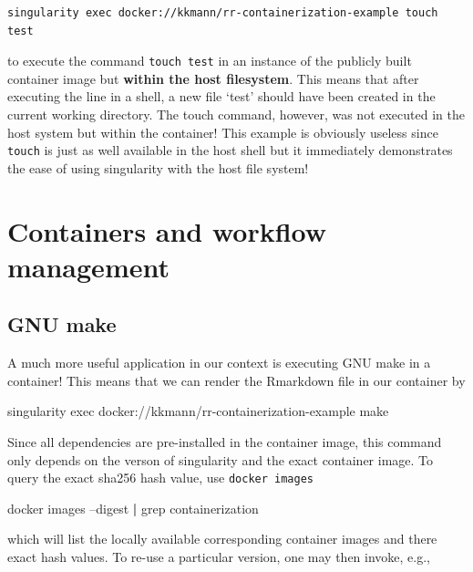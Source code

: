 \documentclass[]{book}
\newenvironment{Shaded}{\begin{snugshade}}{\end{snugshade}}
\newcommand{\KeywordTok}[1]{\textcolor[rgb]{0.13,0.29,0.53}{\textbf{#1}}}
\newcommand{\FunctionTok}[1]{\textcolor[rgb]{0.00,0.00,0.00}{#1}}
\newcommand{\ExtensionTok}[1]{#1}
\newcommand{\NormalTok}[1]{#1}
\begin{document}
\begin{verbatim}
singularity exec docker://kkmann/rr-containerization-example touch test
\end{verbatim}

to execute the command \texttt{touch\ test} in an instance of the
publicly built container image but \textbf{within the host filesystem}.
This means that after executing the line in a shell, a new file `test'
should have been created in the current working directory. The touch
command, however, was not executed in the host system but within the
container! This example is obviously useless since \texttt{touch} is
just as well available in the host shell but it immediately demonstrates
the ease of using singularity with the host file system!

\section{Containers and workflow
management}\label{sct-container-workflow-manager}

\subsection{GNU make}\label{gnu-make}

A much more useful application in our context is executing GNU make in a
container! This means that we can render the Rmarkdown file in our
container by

\begin{Shaded}
\begin{Highlighting}[]
\ExtensionTok{singularity}\NormalTok{ exec docker://kkmann/rr-containerization-example make}
\end{Highlighting}
\end{Shaded}

Since all dependencies are pre-installed in the container image, this
command only depends on the verson of singularity and the exact
container image. To query the exact sha256 hash value, use
\texttt{docker\ images}

\begin{Shaded}
\begin{Highlighting}[]
\ExtensionTok{docker}\NormalTok{ images --digest }\KeywordTok{|} \FunctionTok{grep}\NormalTok{ containerization}
\end{Highlighting}
\end{Shaded}

which will list the locally available corresponding container images and
there exact hash values. To re-use a particular version, one may then
invoke, e.g.,
\end{document}
